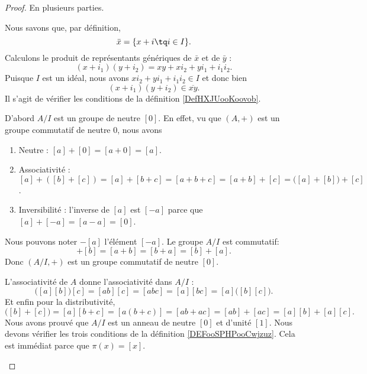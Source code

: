 \begin{proof}
	En plusieurs parties.
	\begin{subproof}
		Nous savons que, par définition,
		\begin{equation}
			\bar x=\{ x+i\tq i\in I \}.
		\end{equation}
		Calculons le produit de représentants génériques de \( \bar x\) et de \( \bar y\) :
		\begin{equation}
			(x+i_1)(y+i_2)=xy+xi_2+yi_1+i_1i_2.
		\end{equation}
		Puisque \( I\) est un idéal, nous avons \( xi_2+yi_1+i_1i_2\in I\) et donc bien
		\begin{equation}
			(x+i_1)(y+i_2)\in \overline{ xy }.
		\end{equation}
		Il s'agit de vérifier les conditions de la définition \ref{DefHXJUooKoovob}.

		D'abord \( A/I\) est un groupe de neutre \( [0]\). En effet, vu que \( (A,+)\) est un groupe commutatif de neutre \( 0\), nous avons
		\begin{enumerate}
			\item Neutre : $[a]+[0]=[a+0]=[a]$.
			\item Associativité :
			      $[a]+([b]+[c])=[a]+[b+c]=[a+b+c]=[a+b]+[c]=\big( [a]+[b] \big)+[c]$.
			\item Inversibilité : l'inverse de \( [a]\) est \( [-a]\) parce que \( [a]+[-a]= [a-a]=[0] \).
		\end{enumerate}
		Nous pouvons noter \( -[a]\) l'élément \( [-a]\). Le groupe \( A/I\) est commutatif:
		\begin{equation}
			[a]+[b]=[a+b]=[b+a]=[b]+[a].
		\end{equation}
		Donc \( (A/I,+)\) est un groupe commutatif de neutre \( [0]\).

		L'associativité de \( A\) donne l'associativité dans \( A/I\) :
		\begin{equation}
			\big( [a][b] \big)[c]=[ab][c]=[abc]=[a][bc]=[a]\big( [b][c] \big).
		\end{equation}
		Et enfin pour la distributivité,
		\begin{equation}
			[a]\big( [b]+[c] \big)=[a][b+c]=[a(b+c)]=[ab+ac]=[ab]+[ac]=[a][b]+[a][c].
		\end{equation}
		Nous avons prouvé que \( A/I\) est un anneau de neutre \( [0]\) et d'unité \( [1]\).
		Nous devons vérifier les trois conditions de la définition \ref{DEFooSPHPooCwjzuz}. Cela est immédiat parce que \( \pi(x)=[x]\).
	\end{subproof}
\end{proof}


